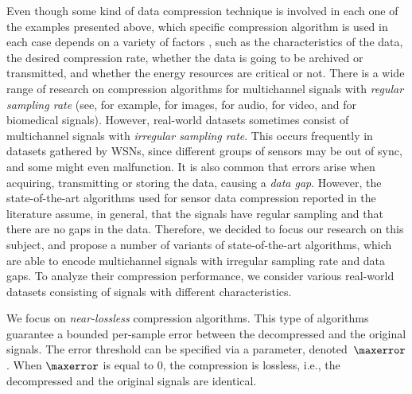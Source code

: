 Even though some kind of data compression technique is involved in each one of the examples presented above, which specific compression algorithm is used in each case depends on a variety of factors \cite{DCTSurvey}, such as the characteristics of the data, the desired compression rate, whether the data is going to be archived or transmitted\footExampleOne, and whether the energy resources are critical or not\footExampleTwo. There is a wide range of research on compression algorithms for multichannel signals with \textit{regular sampling rate} (see, for example, \cite{ImageOne, ImageTwo} for images, \cite{AudioOne, AudioTwo} for audio, \cite{VideoOne, VideoTwo} for video, and \cite{MedicalOne, MedicalTwo} for biomedical signals). However, real-world datasets sometimes consist of multichannel signals with \textit{irregular sampling rate}. This occurs frequently in datasets gathered by WSNs\footSampling, since different groups of sensors may be out of sync, and some might even malfunction. It is also common that errors arise when acquiring, transmitting or storing the data, causing a \textit{data gap}. However, the state-of-the-art algorithms used for sensor data compression reported in the literature \cite{AnEva2013, Signal2016} assume, in general, that the signals have regular sampling and that there are no gaps in the data. Therefore, we decided to focus our research on this subject, and propose a number of variants of state-of-the-art algorithms, which are able to encode multichannel signals with irregular sampling rate and data gaps. To analyze their compression performance, we consider various real-world datasets consisting of signals with different characteristics.


We focus on \textit{near-lossless} compression algorithms. This type of algorithms guarantee a bounded per-sample error between the decompressed and the original signals. The error threshold can be specified via a parameter, denoted~$\maxerror$. When $\maxerror$ is equal to 0, the compression is lossless, i.e., the decompressed and the original signals are identical.


